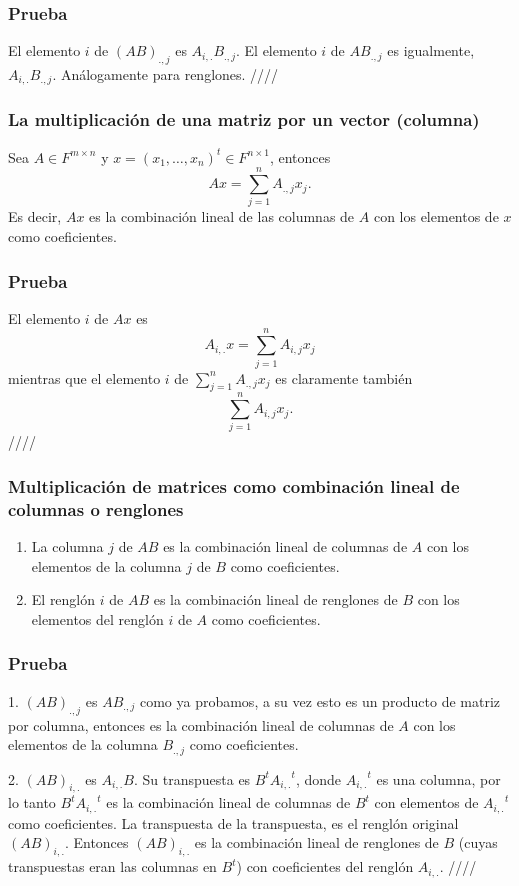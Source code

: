 \documentclass{article}
\begin{document}
\subsubsection*{Prueba}
El elemento $i$ de $(AB)_{.,j}$ es $A_{i,.} B_{.,j}$.
El elemento $i$ de $AB_{.,j}$ es igualmente, $A_{i,.}B_{.,j}$.
Análogamente para renglones. \hfill ////

\subsubsection{La multiplicación de una matriz por un vector (columna)}
Sea $A\in F^{m\times n}$ y $x=(x_1,\ldots,x_n)^t\in F^{n\times 1}$,
entonces
$$Ax=\sum^n_{j=1}A_{.,j} x_j.$$
Es decir, $Ax$ es la combinación lineal de las columnas de $A$
con los elementos de $x$ como coeficientes.
\subsubsection*{Prueba}
El elemento $i$ de $Ax$ es
$$A_{i,.}x=\sum^n_{j=1}A_{i,j}x_j$$
mientras que el elemento $i$ de $\sum^n_{j=1}A_{.,j} x_j$
es claramente también
$$\sum^n_{j=1}A_{i,j} x_j.$$
\hfill ////

\subsubsection{Multiplicación de matrices como combinación lineal
de columnas o renglones}
\begin{enumerate}
    \item La columna $j$ de $AB$ es la combinación lineal de columnas
    de $A$ con los elementos de la columna $j$ de $B$ como coeficientes.
    \item El renglón $i$ de $AB$ es la combinación lineal de renglones
    de $B$ con los elementos del renglón $i$ de $A$ como coeficientes.
\end{enumerate}
\subsubsection*{Prueba}
1. $(AB)_{.,j}$ es $AB_{.,j}$ como ya probamos, a su vez esto
es un producto de matriz por columna, entonces es la combinación lineal
de columnas de $A$ con los elementos de la columna $B_{.,j}$ como
coeficientes.

2. $(AB)_{i,.}$ es $A_{i,.}B$. Su transpuesta es $B^t{A_{i,.}}^t$, donde
${A_{i,.}}^t$ es una columna, por lo tanto $B^t{A_{i,.}}^t$ es la combinación lineal de columnas de $B^t$ con
elementos de ${A_{i,.}}^t$ como coeficientes. La transpuesta de la
transpuesta, es el renglón original $(AB)_{i,.}$. Entonces
$(AB)_{i,.}$ es la combinación lineal de renglones de $B$ (cuyas transpuestas eran las columnas en $B^t$) con coeficientes del renglón $A_{i,.}$.
\hfill ////
\end{document}
